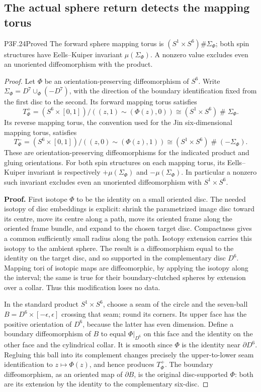 \subsection{The actual sphere return detects the mapping torus}
\begin{statement}{P3F.24}{Proved}
The forward sphere mapping torus is $(S^1\times S^6)\#\Sigma_\Phi$; both spin structures have Eells--Kuiper invariant $\mu(\Sigma_\Phi)$. A nonzero value excludes even an unoriented diffeomorphism with the product.
\end{statement}
\begin{proof}
Let \(\Phi\) be an orientation-preserving diffeomorphism of \(S^6\). Write \(\Sigma_\Phi=D^7\cup_\Phi(-D^7)\), with the direction of the boundary identification fixed from the first disc to the second. Its forward mapping torus satisfies \[
 T^+_\Phi=(S^6\times[0,1])/((z,1)\sim(\Phi(z),0))
       \cong(S^1\times S^6)\mathbin{\#}\Sigma_\Phi.   \tag{P3F.24.1}
\] Its reverse mapping torus, the convention used for the Jin six-dimensional mapping torus, satisfies \[
 T^-_\Phi=(S^6\times[0,1])/((z,0)\sim(\Phi(z),1))
       \cong(S^1\times S^6)\mathbin{\#}(-\Sigma_\Phi).\tag{P3F.24.2}
\] These are orientation-preserving diffeomorphisms for the indicated product and gluing orientations. For both spin structures on each mapping torus, its Eells--Kuiper invariant is respectively \(+\mu(\Sigma_\Phi)\) and \(-\mu(\Sigma_\Phi)\). In particular a nonzero such invariant excludes even an unoriented diffeomorphism with \(S^1\times S^6\).

\textbf{Proof.} First isotope \(\Phi\) to be the identity on a small oriented disc. The needed isotopy of disc embeddings is explicit: shrink the parametrized image disc toward its centre, move its centre along a path, move its oriented frame along the oriented frame bundle, and expand to the chosen target disc. Compactness gives a common sufficiently small radius along the path. Isotopy extension carries this isotopy to the ambient sphere. The result is a diffeomorphism equal to the identity on the target disc, and so supported in the complementary disc \(D^6\). Mapping tori of isotopic maps are diffeomorphic, by applying the isotopy along the interval; the same is true for their boundary-clutched spheres by extension over a collar. Thus this modification loses no data.

In the standard product \(S^1\times S^6\), choose a seam of the circle and the seven-ball \(B=D^6\times[-\epsilon,\epsilon]\) crossing that seam; round its corners. Its upper face has the positive orientation of \(D^6\), because the latter has even dimension. Define a boundary diffeomorphism of \(B\) to equal \(\Phi|_{D^6}\) on this face and the identity on the other face and the cylindrical collar. It is smooth since \(\Phi\) is the identity near \(\partial D^6\). Regluing this ball into its complement changes precisely the upper-to-lower seam identification to \(z\mapsto\Phi(z)\), and hence produces \(T^+_\Phi\). The boundary diffeomorphism, as an oriented map of \(\partial B\), is the original disc-supported \(\Phi\): both are its extension by the identity to the complementary six-disc.


\end{proof}
